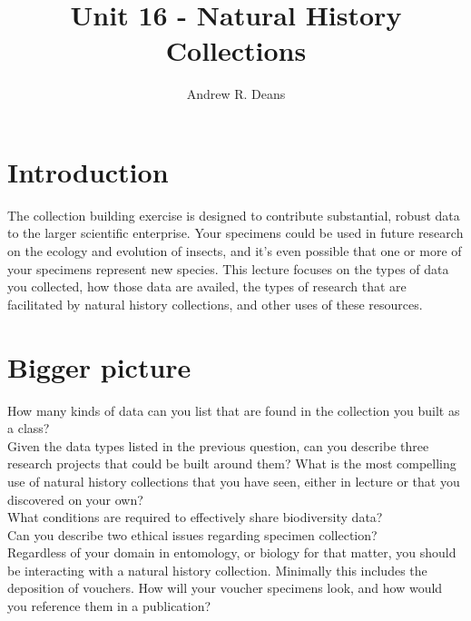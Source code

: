 \documentclass[letterpaper, 11pt]{article}
\title{Unit 16 - Natural History Collections}
\author{Andrew R. Deans}
\begin{document}
\cleanlookdateon %
\maketitle
\thispagestyle{fancy}
\section*{Introduction}
The collection building exercise is designed to contribute substantial, robust data to the larger scientific enterprise. Your specimens could be used in future research on the ecology and evolution of insects, and it's even possible that one or more of your specimens represent new species. This lecture focuses on the types of data you collected, how those data are availed, the types of research that are facilitated by natural history collections, and other uses of these resources.

\section*{Bigger picture}

\noindent{}How many kinds of data can you list that are found in the collection you built as a class?\\

\noindent{}Given the data types listed in the previous question, can you describe three research projects that could be built around them? What is the most compelling use of natural history collections that you have seen, either in lecture or that you discovered on your own?\\

\noindent{}What conditions are required to effectively share biodiversity data?\\

\noindent{}Can you describe two ethical issues regarding specimen collection? \\

\noindent{}Regardless of your domain in entomology, or biology for that matter, you should be interacting with a natural history collection. Minimally this includes the deposition of vouchers. How will your voucher specimens look, and how would you reference them in a publication?\\
\end{document}
